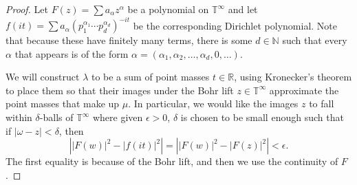 \documentclass[]{elsarticle}
\newcommand{\R}{\mathbb{R}}
\newcommand{\N}{\mathbb{N}}
\newcommand{\T}{\mathbb{T}}
\numberwithin{equation}{section}
\begin{document}
      \begin{proof}
        Let $F(z) = \sum a_{\alpha} z^{\alpha}$ be a polynomial on $\T^\infty$ and let $f(it)= \sum a_\alpha (p_1^{\alpha_1}\cdots p_d^{\alpha_d})^{-it}$ be the corresponding Dirichlet polynomial. Note that because these have finitely many terms, there is some $d\in \N$ such that every $\alpha$ that appears is of the form $\alpha = (\alpha_1, \alpha_2, \dots, \alpha_d, 0, \dots)$.

        We will construct $\lambda$ to be a sum of point masses $t\in\R$, using Kronecker's theorem to place them so that their images under the Bohr lift $z\in \T^\infty$ approximate the point masses that make up $\mu$. In particular, we would like the images $z$ to fall within $\delta$-balls of $\T^\infty$ where given $\epsilon>0$, $\delta$ is chosen to be small enough such that if $|\omega-z|<\delta$, then
        \begin{equation} \label{continuitything}
          \left| |F(w)|^2-|f(it)|^2 \right| = \left| |F(w)|^2-|F(z)|^2 \right|< \epsilon.
        \end{equation}
        The first equality is because of the Bohr lift, and then we use the continuity of $F$.


\end{proof}
\end{document}

